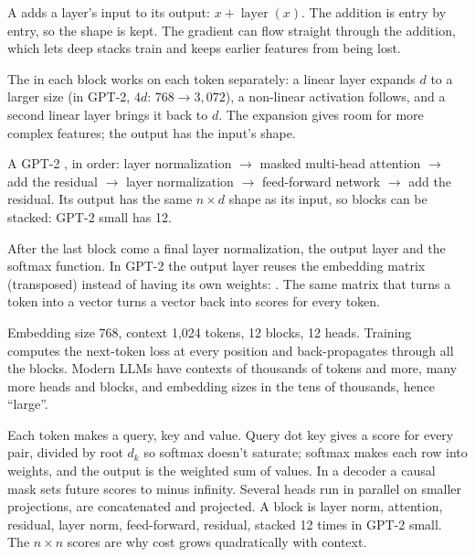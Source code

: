 \begin{definition}
A  adds a layer's input to its output: $x + \operatorname{layer}(x)$. The addition is entry by entry, so the shape is kept. The gradient can flow straight through the addition, which lets deep stacks train and keeps earlier features from being lost.
\end{definition}

\begin{definition}
The  in each block works on each token separately: a linear layer expands $d$ to a larger size (in GPT-2, $4d$: $768 \to 3{,}072$), a non-linear activation follows, and a second linear layer brings it back to $d$. The expansion gives room for more complex features; the output has the input's shape.
\end{definition}

\begin{definition}
A GPT-2 , in order: layer normalization $\to$ masked multi-head attention $\to$ add the residual $\to$ layer normalization $\to$ feed-forward network $\to$ add the residual. Its output has the same $n \times d$ shape as its input, so blocks can be stacked: GPT-2 small has 12.
\end{definition}

\begin{definition}
After the last block come a final layer normalization, the output layer and the softmax function. In GPT-2 the output layer reuses the embedding matrix (transposed) instead of having its own weights: . The same matrix that turns a token into a vector turns a vector back into scores for every token.
\end{definition}

\begin{remark}
Embedding size 768, context 1,024 tokens, 12 blocks, 12 heads. Training computes the next-token loss at every position and back-propagates through all the blocks. Modern LLMs have contexts of thousands of tokens and more, many more heads and blocks, and embedding sizes in the tens of thousands, hence ``large''.
\end{remark}

\begin{sayit}
Each token makes a query, key and value. Query dot key gives a score for every pair, divided by root $d_k$ so softmax doesn't saturate; softmax makes each row into weights, and the output is the weighted sum of values. In a decoder a causal mask sets future scores to minus infinity. Several heads run in parallel on smaller projections, are concatenated and projected. A block is layer norm, attention, residual, layer norm, feed-forward, residual, stacked 12 times in GPT-2 small. The $n \times n$ scores are why cost grows quadratically with context.
\end{sayit}

